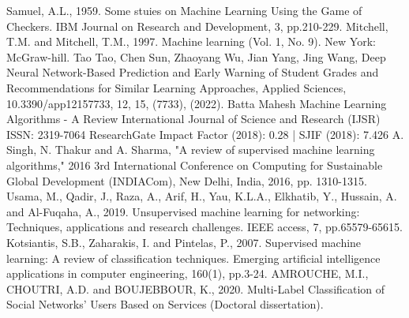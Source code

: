 \documentclass[conference]{IEEEtran}
\begin{document}
\begin{thebibliography}{00}


\nocite{*}
Samuel, A.L., 1959. Some stuies on Machine Learning Using the Game of Checkers. IBM Journal on Research and Development, 3, pp.210-229.	
Mitchell, T.M. and Mitchell, T.M., 1997. Machine learning (Vol. 1, No. 9). New York: McGraw-hill.
 Tao Tao, Chen Sun, Zhaoyang Wu, Jian Yang, Jing Wang, Deep Neural Network-Based Prediction and Early Warning of Student Grades and Recommendations for Similar Learning Approaches, Applied Sciences, 10.3390/app12157733, 12, 15, (7733), (2022).
Batta Mahesh Machine Learning Algorithms - A Review International Journal of Science and Research (IJSR) ISSN: 2319-7064 ResearchGate Impact Factor (2018): 0.28 | SJIF (2018): 7.426
A. Singh, N. Thakur and A. Sharma, "A review of supervised machine learning algorithms," 2016 3rd International Conference on Computing for Sustainable Global Development (INDIACom), New Delhi, India, 2016, pp. 1310-1315.
Usama, M., Qadir, J., Raza, A., Arif, H., Yau, K.L.A., Elkhatib, Y., Hussain, A. and Al-Fuqaha, A., 2019. Unsupervised machine learning for networking: Techniques, applications and research challenges. IEEE access, 7, pp.65579-65615.
Kotsiantis, S.B., Zaharakis, I. and Pintelas, P., 2007. Supervised machine learning: A review of classification techniques. Emerging artificial intelligence applications in computer engineering, 160(1), pp.3-24.
AMROUCHE, M.I., CHOUTRI, A.D. and BOUJEBBOUR, K., 2020. Multi-Label Classification of Social Networks’ Users Based on Services (Doctoral dissertation).


\end{thebibliography}
\end{document}
